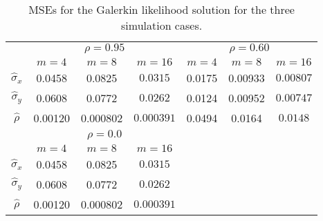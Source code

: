 \begin{table}
  \centering
  \begin{tabular}{cccc|ccc|}
    &  \multicolumn{3}{c}{$\rho=0.95$} & \multicolumn{3}{c}{$\rho=0.60$} \\
    & $m=4$ & $m=8$ & $m=16$ & $m=4$ & $m=8$ & $m=16$  \\
    $\hat{\sigma}_x$ & 0.0458 & 0.0825 & $\mathbf{0.0315}$ &  0.0175  & 0.00933 & $\mathbf{0.00807}$ \\
    $\hat{\sigma}_y$ & 0.0608 & 0.0772 & $\mathbf{0.0262}$  & 0.0124  & 0.00952 & $\mathbf{0.00747}$ \\
    $\hat{\rho}$ & 0.00120 & 0.000802 & $\mathbf{0.000391}$ & 0.0494  & 0.0164 & $\mathbf{0.0148}$  \\
    &  \multicolumn{3}{c}{$\rho=0.0$}\\
    & $m=4$ & $m=8$ & $m=16$ \\
    $\hat{\sigma}_x$ & 0.0458 & 0.0825 & $\mathbf{0.0315}$ \\
    $\hat{\sigma}_y$ & 0.0608 & 0.0772 & $\mathbf{0.0262}$  \\
    $\hat{\rho}$ & 0.00120 & 0.000802 & $\mathbf{0.000391}$ 
  \end{tabular}
  \caption{MSEs for the Galerkin likelihood solution for the three simulation cases.}
  \label{tab:MSEs}
\end{table}

